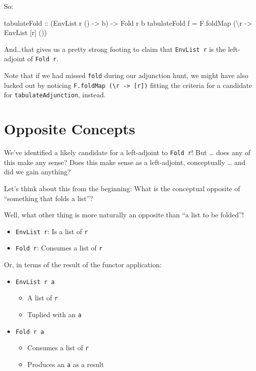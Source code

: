 \documentclass[]{article}
\newenvironment{Shaded}{}{}
\newcommand{\DataTypeTok}[1]{\textcolor[rgb]{0.56,0.13,0.00}{#1}}
\newcommand{\NormalTok}[1]{#1}
\newcommand{\OtherTok}[1]{\textcolor[rgb]{0.00,0.44,0.13}{#1}}
\begin{document}
So:

\begin{Shaded}
\begin{Highlighting}[]
\OtherTok{tabulateFold ::}\NormalTok{ (}\DataTypeTok{EnvList}\NormalTok{ r () }\OtherTok{{-}>}\NormalTok{ b) }\OtherTok{{-}>} \DataTypeTok{Fold}\NormalTok{ r b}
\NormalTok{tabulateFold f }\OtherTok{=}\NormalTok{ F.foldMap (\textbackslash{}r }\OtherTok{{-}>} \DataTypeTok{EnvList}\NormalTok{ [r] ())}
\end{Highlighting}
\end{Shaded}

And\ldots that gives us a pretty strong footing to claim that
\texttt{EnvList\ r} is the left-adjoint of \texttt{Fold\ r}.

Note that if we had missed \texttt{fold} during our adjunction hunt, we might
have also lucked out by noticing
\texttt{F.foldMap\ (\textbackslash{}r\ -\textgreater{}\ {[}r{]})} fitting the
criteria for a candidate for \texttt{tabulateAdjunction}, instead.

\hypertarget{opposite-concepts}{%
\section{Opposite Concepts}\label{opposite-concepts}}

We've identified a likely candidate for a left-adjoint to \texttt{Fold\ r}! But
\ldots{} does any of this make any sense? Does this make sense as a
left-adjoint, conceptually \ldots{} and did we gain anything?

Let's think about this from the beginning: What is the conceptual opposite of
``something that folds a list''?

Well, what other thing is more naturally an opposite than ``a list to be
folded''!

\begin{itemize}
\tightlist
\item
  \texttt{EnvList\ r}: Is a list of \texttt{r}
\item
  \texttt{Fold\ r}: Consumes a list of \texttt{r}
\end{itemize}

Or, in terms of the result of the functor application:

\begin{itemize}
\tightlist
\item
  \texttt{EnvList\ r\ a}

  \begin{itemize}
  \tightlist
  \item
    A list of \texttt{r}
  \item
    Tuplied with an \texttt{a}
  \end{itemize}
\item
  \texttt{Fold\ r\ a}

  \begin{itemize}
  \tightlist
  \item
    Consumes a list of \texttt{r}
  \item
    Produces an \texttt{a} as a result
  \end{itemize}
\end{itemize}
\end{document}

